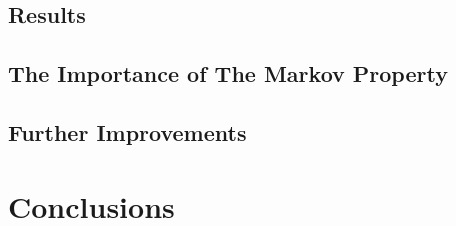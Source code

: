     \subsection{Results}\label{subchap:aisResults}
    
    \subsection{The Importance of The Markov Property}\label{subchap:importance}
    
    \subsection{Further Improvements}
    
 
\newpage   
\section{Conclusions}\label{chap:conclusions}
